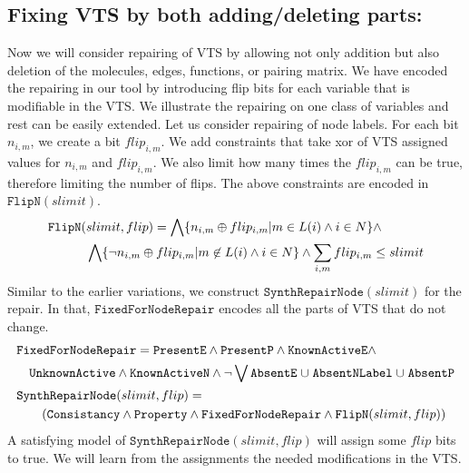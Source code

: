 \subsection{Fixing VTS by both adding/deleting parts:}
%
Now we will consider repairing of VTS by allowing not only addition but also
deletion of the molecules, edges, functions, or pairing matrix.
%
We have encoded the repairing in our tool by introducing flip bits
for each variable that is modifiable in the VTS.
%
We illustrate the repairing on one class of variables and rest can be
easily extended.
%
Let us consider repairing of node labels.
%
For each bit $n_{i,m}$, we create a bit $flip_{i,m}$.
%
We add constraints that take xor of VTS assigned values for  $n_{i,m}$
and $flip_{i,m}$.
%
We also limit how many times the $flip_{i,m}$ can be true, therefore
limiting the number of flips.
%
The above constraints are encoded in $\texttt{FlipN}(slimit)$.
\begin{align*}
    &\texttt{FlipN}(slimit,flip) = \bigwedge \{n_{i,m}\oplus flip_{i,m}| m \in L(i) \land i \in N \} \land \\
  & \quad \quad \quad
    \bigwedge \{ \lnot n_{i,m}\oplus flip_{i,m}| m \not \in L(i) \land i \in N \} \land  \sum\limits_{i,m} flip_{i,m} \leq slimit
\end{align*}
%
Similar to the earlier variations, we construct
$\texttt{SynthRepairNode}(slimit)$ for the repair.
%
In that, $\texttt{FixedForNodeRepair}$ encodes all the parts of VTS that do not change.
\begin{align*}
    & \texttt{FixedForNodeRepair} =  \texttt{PresentE} \land  
      \texttt{PresentP} \land \texttt{KnownActiveE} 
      \land \\
  & \quad \texttt{UnknownActive} \land \texttt{KnownActiveN} \land \lnot 
    \bigvee \texttt{AbsentE} \;{\cup}\; \texttt{AbsentNLabel} \;{\cup}\;
    \texttt{AbsentP}\\
  &\texttt{SynthRepairNode}(slimit,flip) = \\
  & \quad\quad
    (  \texttt{Consistancy}\land \texttt{Property} \land
    \texttt{FixedForNodeRepair} \land \texttt{FlipN}(slimit,flip) )
\end{align*}
A satisfying model of $\texttt{SynthRepairNode}(slimit,flip)$ will assign some
$flip$ bits to true.
We will learn from the assignments the needed modifications in the VTS. 

